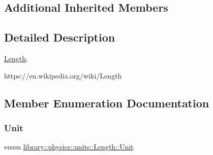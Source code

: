 \subsection*{Additional Inherited Members}


\subsection{Detailed Description}
\hyperlink{classlibrary_1_1physics_1_1units_1_1_length}{Length}. 

https\+://en.wikipedia.\+org/wiki/\+Length 

\subsection{Member Enumeration Documentation}
\mbox{\label{classlibrary_1_1physics_1_1units_1_1_length_a3b8b39cd245cf6b19dc34459baeccb18}} 
\subsubsection{\texorpdfstring{Unit}{Unit}}
{\footnotesize\ttfamily enum \hyperlink{classlibrary_1_1physics_1_1units_1_1_length_a3b8b39cd245cf6b19dc34459baeccb18}{library\+::physics\+::units\+::\+Length\+::\+Unit}\hspace{0.3cm}{\ttfamily [strong]}}

